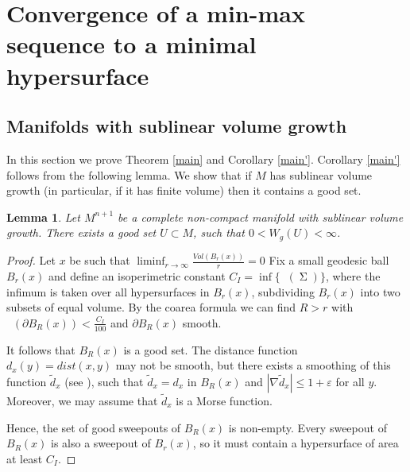 \documentclass[12pt]{amsart}
\newtheorem{lemma}[theorem]{Lemma}
\DeclareMathOperator{\Hn}{\mathcal{H}^n}
\DeclareMathOperator{\Si}{\Sigma}
\theoremstyle{definition}
\begin{document}
\section{Convergence of a min-max sequence to 
a minimal hypersurface}
\label{sec: convergence}

\subsection{Manifolds with sublinear volume growth}
In this section we prove Theorem \ref*{main} and Corollary \ref*{main'}.
Corollary \ref*{main'} follows from the following lemma.
We show that if $M$ has sublinear volume growth
(in particular, if it has finite volume) then it contains 
a good set.

\begin{lemma}
Let $M^{n+1}$ be a complete non-compact manifold
with sublinear volume growth.
There exists a good set $U \subset M$, such that
$0< W_g(U) < \infty$.
\end{lemma}

\begin{proof}
Let $x$ be such that $\liminf_{r \rightarrow \infty} \frac{Vol(B_r(x))}{r} =0 $
Fix a small geodesic ball $B_r(x)$
and define an isoperimetric constant $C_I = \inf \{\Hn(\Si) \}$,
where the infimum is taken over all
hypersurfaces in $B_r(x)$, subdividing $B_r(x)$
into two subsets of equal volume.
By the coarea formula we can find $R>r$ with
$\Hn(\partial B_R(x)) < \frac{C_I}{100}$
and $\partial B_R(x)$ smooth.

It follows that $B_R(x)$ is a good set.
The distance function $d_x(y) = dist(x,y)$
may not be smooth, but there exists
a smoothing of this function $\tilde{d}_x$ (see \cite{GW}),
such that $\tilde{d}_x = d_x$ in 
$B_R(x)$ and $|\nabla \tilde{d}_x| \leq 1 +\varepsilon$ for all $y$.
Moreover, we may assume that $\tilde{d}_x$ is a Morse function.

Hence, 
the set of good sweepouts of $B_R(x)$ is non-empty.
Every sweepout of $B_R(x)$ is also a sweepout of 
$B_r(x)$, so it must contain a hypersurface of area
at least $C_I$.
\end{proof}

\end{document}

